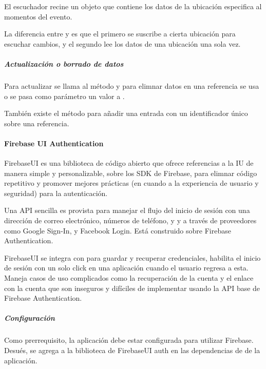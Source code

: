 El escuchador recine un objeto  que contiene los datos de la
ubicación especifica al momentos del evento.

La diferencia entre  y
 es que el primero se suscribe a cierta
ubicación para escuchar cambios, y el segundo lee los datos de una ubicación
una sola vez.


\subparagraph{Actualización o borrado de datos}
\label{\detokenize{dev_docs:actulizacion-o-borrado-de-datos}}
Para actualizar se llama al método  y para elimnar datos
en una referencia se usa  o se pasa como parámetro un valor
 a .

También existe el método  para añadir una entrada con un identificador
único sobre una referencia.


\paragraph{Firebase UI Authentication}
\label{\detokenize{dev_docs:firebase-ui-authentication}}
FirebaseUI es una biblioteca de código abierto que ofrece referencias a la IU
de manera simple y personalizable, sobre los SDK de Firebase, para elimnar
código repetitivo y promover mejores prácticas (en cuando a la experiencia
de usuario y seguridad) para la autenticación.

Una API sencilla es provista para manejar el flujo del inicio de sesión con una
dirección de correo electrónico, números de teléfono, y y a través de
proveedores como Google Sign-In, y Facebook Login. Está construido sobre
Firebase Authentication.

FirebaseUI se integra con  para guardar y recuperar credenciales,
habilita el inicio de sesión con un solo click en una aplicación cuando el
usuario regresa a esta. Maneja casos de uso complicados como la recuperación
de la cuenta y el enlace con la cuenta que son inseguros y difíciles de implementar
usando la API base de Firebase Authentication.


\subparagraph{Configuración}
\label{\detokenize{dev_docs:configuracion}}
Como prerrequisito, la aplicación debe estar configurada para utilizar Firebase.
Desués, se agrega a la biblioteca de FirebaseUI auth en las dependencias de
 de la aplicación.

%
\begin{sphinxVerbatim}[commandchars=\\\{\}]
 
   
\end{sphinxVerbatim}



